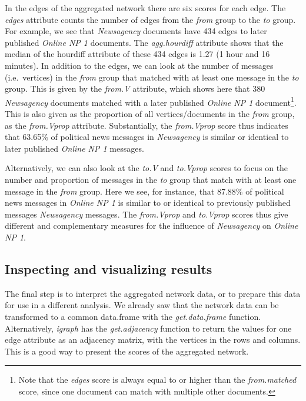 In the edges of the aggregated network there are six scores for each
edge. The \emph{edges} attribute counts the number of edges from the
\emph{from} group to the \emph{to} group. For example, we see that
\emph{Newsagency} documents have 434 edges to later published
\emph{Online NP 1} documents. The \emph{agg.hourdiff} attribute shows
that the median of the hourdiff attribute of these 434 edges is 1.27 (1
hour and 16 minutes). In addition to the edges, we can look at the
number of messages (i.e.~vertices) in the \emph{from} group that matched
with at least one message in the \emph{to} group. This is given by the
\emph{from.V} attribute, which shows here that 380 \emph{Newsagency}
documents matched with a later published \emph{Online NP 1}
document\footnote{Note that the \emph{edges} score is always equal to or
  higher than the \emph{from.matched} score, since one document can
  match with multiple other documents.}. This is also given as the
proportion of all vertices/documents in the \emph{from} group, as the
\emph{from.Vprop} attribute. Substantially, the \emph{from.Vprop} score
thus indicates that 63.65\% of political news messages in
\emph{Newsagency} is similar or identical to later published
\emph{Online NP 1} messages.

Alternatively, we can also look at the \emph{to.V} and \emph{to.Vprop}
scores to focus on the number and proportion of messages in the
\emph{to} group that match with at least one message in the \emph{from}
group. Here we see, for instance, that 87.88\% of political news
messages in \emph{Online NP 1} is similar to or identical to previously
published messages \emph{Newsagency} messages. The \emph{from.Vprop} and
\emph{to.Vprop} scores thus give different and complementary measures
for the influence of \emph{Newsagency} on \emph{Online NP 1}.

\subsection{Inspecting and visualizing results}

The final step is to interpret the aggregated network data, or to
prepare this data for use in a different analysis. We already saw that
the network data can be transformed to a common data.frame with the
\emph{get.data.frame} function. Alternatively, \emph{igraph} has the
\emph{get.adjacency} function to return the values for one edge
attribute as an adjacency matrix, with the vertices in the rows and
columns. This is a good way to present the scores of the aggregated
network.

